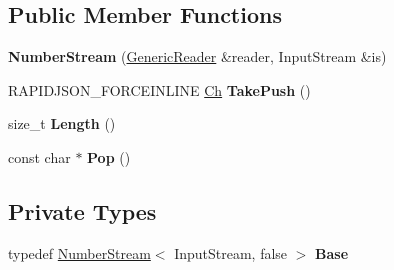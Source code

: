 \subsection*{Public Member Functions}
\begin{DoxyCompactItemize}
\item 
{\bfseries Number\+Stream} (\hyperlink{class_generic_reader}{Generic\+Reader} \&reader, Input\+Stream \&is)\hypertarget{class_generic_reader_1_1_number_stream_3_01_input_stream_00_01true_01_4_af03b072ae679aa2540847868bb897046}{}\label{class_generic_reader_1_1_number_stream_3_01_input_stream_00_01true_01_4_af03b072ae679aa2540847868bb897046}

\item 
R\+A\+P\+I\+D\+J\+S\+O\+N\+\_\+\+F\+O\+R\+C\+E\+I\+N\+L\+I\+NE \hyperlink{class_generic_reader_ab39a92bb26d50aee6469df604622218a}{Ch} {\bfseries Take\+Push} ()\hypertarget{class_generic_reader_1_1_number_stream_3_01_input_stream_00_01true_01_4_a92a861778697e2bd3d127c652c242ef6}{}\label{class_generic_reader_1_1_number_stream_3_01_input_stream_00_01true_01_4_a92a861778697e2bd3d127c652c242ef6}

\item 
size\+\_\+t {\bfseries Length} ()\hypertarget{class_generic_reader_1_1_number_stream_3_01_input_stream_00_01true_01_4_a02efe79763a7065c49a129dc7e69f677}{}\label{class_generic_reader_1_1_number_stream_3_01_input_stream_00_01true_01_4_a02efe79763a7065c49a129dc7e69f677}

\item 
const char $\ast$ {\bfseries Pop} ()\hypertarget{class_generic_reader_1_1_number_stream_3_01_input_stream_00_01true_01_4_a11de3c49c13689294bd734bc09053cd0}{}\label{class_generic_reader_1_1_number_stream_3_01_input_stream_00_01true_01_4_a11de3c49c13689294bd734bc09053cd0}

\end{DoxyCompactItemize}
\subsection*{Private Types}
\begin{DoxyCompactItemize}
\item 
typedef \hyperlink{class_generic_reader_1_1_number_stream}{Number\+Stream}$<$ Input\+Stream, false $>$ {\bfseries Base}\hypertarget{class_generic_reader_1_1_number_stream_3_01_input_stream_00_01true_01_4_a92b58152ce949c877528fd2569179289}{}\label{class_generic_reader_1_1_number_stream_3_01_input_stream_00_01true_01_4_a92b58152ce949c877528fd2569179289}

\end{DoxyCompactItemize}
